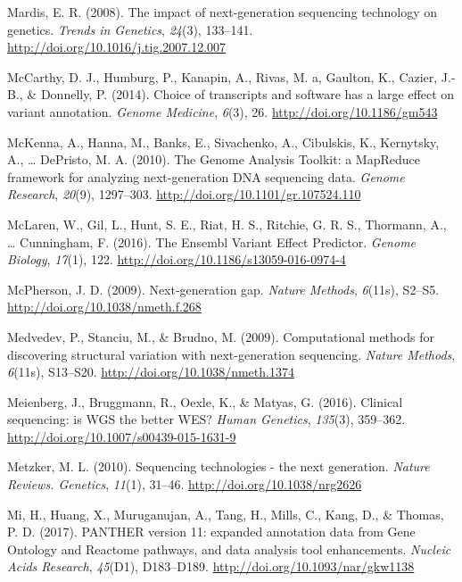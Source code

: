 \documentclass[12pt,twoside]{reedthesis}
\theoremstyle{definition}
\theoremstyle{definition}
\theoremstyle{remark}
\begin{document}
  \hypertarget{ref-Mardis2008}{}
  Mardis, E. R. (2008). The impact of next-generation sequencing
  technology on genetics. \emph{Trends in Genetics}, \emph{24}(3),
  133--141. \url{http://doi.org/10.1016/j.tig.2007.12.007}
  
  \hypertarget{ref-McCarthy2014}{}
  McCarthy, D. J., Humburg, P., Kanapin, A., Rivas, M. a, Gaulton, K.,
  Cazier, J.-B., \& Donnelly, P. (2014). Choice of transcripts and
  software has a large effect on variant annotation. \emph{Genome
  Medicine}, \emph{6}(3), 26. \url{http://doi.org/10.1186/gm543}
  
  \hypertarget{ref-McKenna2010}{}
  McKenna, A., Hanna, M., Banks, E., Sivachenko, A., Cibulskis, K.,
  Kernytsky, A., \ldots{} DePristo, M. A. (2010). The Genome Analysis
  Toolkit: a MapReduce framework for analyzing next-generation DNA
  sequencing data. \emph{Genome Research}, \emph{20}(9), 1297--303.
  \url{http://doi.org/10.1101/gr.107524.110}
  
  \hypertarget{ref-McLaren2016}{}
  McLaren, W., Gil, L., Hunt, S. E., Riat, H. S., Ritchie, G. R. S.,
  Thormann, A., \ldots{} Cunningham, F. (2016). The Ensembl Variant Effect
  Predictor. \emph{Genome Biology}, \emph{17}(1), 122.
  \url{http://doi.org/10.1186/s13059-016-0974-4}
  
  \hypertarget{ref-McPherson2009}{}
  McPherson, J. D. (2009). Next-generation gap. \emph{Nature Methods},
  \emph{6}(11s), S2--S5. \url{http://doi.org/10.1038/nmeth.f.268}
  
  \hypertarget{ref-Medvedev2009}{}
  Medvedev, P., Stanciu, M., \& Brudno, M. (2009). Computational methods
  for discovering structural variation with next-generation sequencing.
  \emph{Nature Methods}, \emph{6}(11s), S13--S20.
  \url{http://doi.org/10.1038/nmeth.1374}
  
  \hypertarget{ref-Meienberg2016}{}
  Meienberg, J., Bruggmann, R., Oexle, K., \& Matyas, G. (2016). Clinical
  sequencing: is WGS the better WES? \emph{Human Genetics}, \emph{135}(3),
  359--362. \url{http://doi.org/10.1007/s00439-015-1631-9}
  
  \hypertarget{ref-Metzker2010}{}
  Metzker, M. L. (2010). Sequencing technologies - the next generation.
  \emph{Nature Reviews. Genetics}, \emph{11}(1), 31--46.
  \url{http://doi.org/10.1038/nrg2626}
  
  \hypertarget{ref-Mi2017}{}
  Mi, H., Huang, X., Muruganujan, A., Tang, H., Mills, C., Kang, D., \&
  Thomas, P. D. (2017). PANTHER version 11: expanded annotation data from
  Gene Ontology and Reactome pathways, and data analysis tool
  enhancements. \emph{Nucleic Acids Research}, \emph{45}(D1), D183--D189.
  \url{http://doi.org/10.1093/nar/gkw1138}
  
\end{document}
